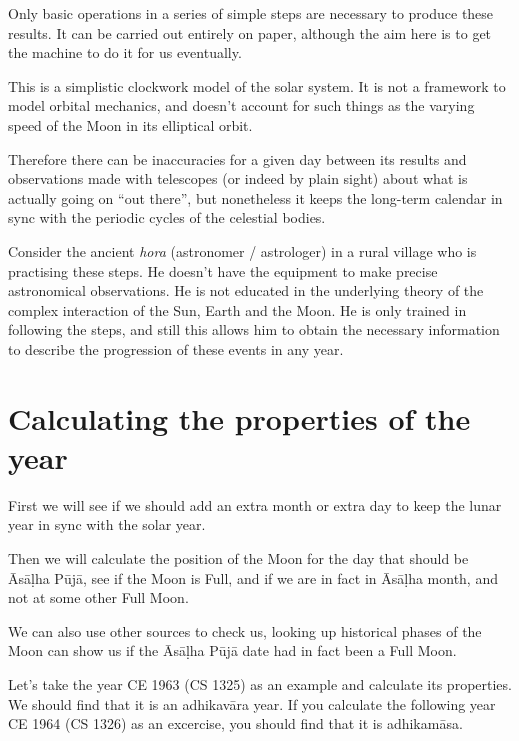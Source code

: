 \documentclass[11pt,oneside]{memoir-article}
\begin{document}

Only basic operations in a series of simple steps are necessary to produce these
results. It can be carried out entirely on paper, although the aim here is to
get the machine to do it for us eventually.

This is a simplistic clockwork model of the solar system. It is not a framework
to model orbital mechanics, and doesn't account for such things as the varying
speed of the Moon in its elliptical orbit.

Therefore there can be inaccuracies for a given day between its results and
observations made with telescopes (or indeed by plain sight) about what is
actually going on ``out there'', but nonetheless it keeps the long-term calendar
in sync with the periodic cycles of the celestial bodies.

Consider the ancient \emph{hora}  (astronomer / astrologer) in a rural village who is
practising these steps. He doesn't have the equipment to make precise
astronomical observations. He is not educated in the underlying theory of the
complex interaction of the Sun, Earth and the Moon. He is only trained in
following the steps, and still this allows him to obtain the necessary
information to describe the progression of these events in any year.

\section{Calculating the properties of the year}
\label{sec-4-2}

First we will see if we should add an extra month or extra day to keep the
lunar year in sync with the solar year.

Then we will calculate the position of the Moon for the day that should be
Āsāḷha Pūjā, see if the Moon is Full, and if we are in fact in Āsāḷha month, and
not at some other Full Moon.

We can also use other sources to check us, looking up historical phases of the
Moon can show us if the Āsāḷha Pūjā date had in fact been a Full Moon.

Let's take the year CE 1963 (CS 1325) as an example and calculate its
properties. We should find that it is an adhikavāra year. If you calculate the
following year CE 1964 (CS 1326) as an excercise, you should find that it is
adhikamāsa.
\end{document}
